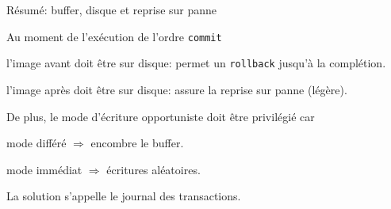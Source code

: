 \documentclass[aspectratio=169, handout]{beamer} %
\begin{document}
\begin{frame}{Résumé: buffer, disque et reprise sur panne}

Au moment de l'exécution de l'ordre \texttt{commit}


\begin{redbullet}

  \item \alert{l'image avant doit être sur disque}: permet un \texttt{rollback} jusqu'à la complétion.

  \item \alert{l'image après} doit être sur disque: assure la reprise sur panne  (légère).

\end{redbullet}

\vfill

De plus, le mode d'écriture opportuniste doit être privilégié car

\vfill

\begin{redbullet}

  \item  mode différé $\Rightarrow$ encombre le buffer.  

  \item  mode immédiat $\Rightarrow$  écritures aléatoires.

\end{redbullet}

\vfill

\begin{blocgauche}
La solution s'appelle le \alert{journal des transactions}.
\end{blocgauche}
\vfill
{}

\end{frame}
\end{document}
